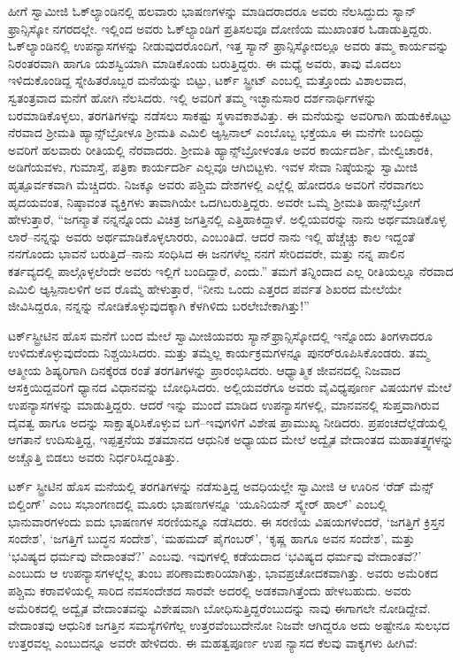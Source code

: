 ಹೀಗೆ ಸ್ವಾಮೀಜಿ ಓಕ್​ಲ್ಯಾಂಡಿನಲ್ಲಿ ಹಲವಾರು ಭಾಷಣಗಳನ್ನು ಮಾಡಿದರಾದರೂ ಅವರು ನೆಲಸಿದ್ದುದು ಸ್ಯಾನ್ ಫ್ರಾನ್ಸಿಸ್ಕೋ ನಗರದಲ್ಲೇ. ಇಲ್ಲಿಂದ ಅವರು ಓಕ್​ಲ್ಯಾಂಡಿಗೆ ಪ್ರತಿಸಲವೂ ದೋಣಿಯ ಮುಖಾಂತರ ಓಡಾಡುತ್ತಿದ್ದರು. ಓಕ್​ಲ್ಯಾಂಡಿನಲ್ಲಿ ಉಪನ್ಯಾಸಗಳನ್ನು ನೀಡುವುದರೊಂದಿಗೆ, ಇತ್ತ ಸ್ಯಾನ್ ಫ್ರಾನ್ಸಿಸ್ಕೋದಲ್ಲೂ ಅವರು ತಮ್ಮ ಕಾರ್ಯವನ್ನು ನಿರಂತರವಾಗಿ ಹಾಗೂ ಯಶಸ್ವಿಯಾಗಿ ಮಾಡಿಕೊಂಡು ಬರುತ್ತಿದ್ದರು. ಈ ಮಧ್ಯೆ ಅವರು, ತಾವು ಮೊದಲು ಇಳಿದುಕೊಂಡಿದ್ದ ಸ್ನೇಹಿತರೊಬ್ಬರ ಮನೆಯನ್ನು ಬಿಟ್ಟು, ಟರ್ಕ್ ಸ್ಟ್ರೀಟ್ ಎಂಬಲ್ಲಿ ಮತ್ತೊಂದು ವಿಶಾಲವಾದ, ಸ್ವತಂತ್ರವಾದ ಮನೆಗೆ ಹೋಗಿ ನೆಲಸಿದರು. ಇಲ್ಲಿ ಅವರಿಗೆ ತಮ್ಮ ಇಚ್ಛಾನುಸಾರ ದರ್ಶನಾರ್ಥಿಗಳನ್ನು ಬರಮಾಡಿಕೊಳ್ಳಲು, ತರಗತಿಗಳನ್ನು ನಡೆಸಲು ಸಾಕಷ್ಟು ಸ್ಥಳಾವಕಾಶವಿತ್ತು. ಈ ಮನೆಯನ್ನು ಅವರಿಗಾಗಿ ಹುಡುಕಿಕೊಟ್ಟು ನೆರವಾದ ಶ್ರೀಮತಿ ಹ್ಯಾನ್ಸ್​ಬ್ರೋಳೂ ಶ್ರೀಮತಿ ಎಮಿಲಿ ಆ್ಯಸ್ಪಿನಾಲ್ ಎಂಬೊಬ್ಬ ಭಕ್ತೆಯೂ ಈ ಮನೆಗೇ ಬಂದಿದ್ದು ಅವರಿಗೆ ಹಲವಾರು ರೀತಿಯಲ್ಲಿ ನೆರವಾದರು. ಶ್ರೀಮತಿ ಹ್ಯಾನ್ಸ್​ಬ್ರೋಳಂತೂ ಅವರ ಕಾರ್ಯದರ್ಶಿ, ಮೇಲ್ವಿಚಾರಕಿ, ಅಡಿಗೆಯವಳು, ಗುಮಾಸ್ತೆ, ಪತ್ರಿಕಾ ಕಾರ್ಯದರ್ಶಿ ಎಲ್ಲವೂ ಆಗಿಬಿಟ್ಟಳು. ಇವಳ ಸೇವಾ ನಿಷ್ಠೆಯನ್ನು ಸ್ವಾಮೀಜಿ ಹೃತ್ಪೂರ್ವಕವಾಗಿ ಮೆಚ್ಚಿದರು. ನಿಜಕ್ಕೂ ಅವರು ಪಶ್ಚಿಮ ದೇಶಗಳಲ್ಲಿ ಎಲ್ಲೆಲ್ಲಿ ಹೋದರೂ ಅವರಿಗೆ ನೆರವಾಗಲು ಹೃದಯವಂತ, ನಿಷ್ಠಾವಂತ ವ್ಯಕ್ತಿಗಳು ತಾವಾಗಿಯೇ ಒದಗಿಬರುತ್ತಿದ್ದರು. ಅವರೇ ಒಮ್ಮೆ ಶ್ರೀಮತಿ ಹಾನ್ಸ್​ಬ್ರೋಗೆ ಹೇಳುತ್ತಾರೆ, “ಜಗನ್ಮಾತೆ ನನ್ನನ್ನೊಂದು ವಿಚಿತ್ರ ಜಗತ್ತಿನಲ್ಲಿ ಎತ್ತಿಹಾಕಿದ್ದಾಳೆ. ಅಲ್ಲಿಯವರನ್ನು ನಾನು ಅರ್ಥಮಾಡಿಕೊಳ್ಳ ಲಾರೆ–ನನ್ನನ್ನು ಅವರು ಅರ್ಥಮಾಡಿಕೊಳ್ಳಲಾರರು, ಎಂಬಂತಿದೆ. ಆದರೆ ನಾನು ಇಲ್ಲಿ ಹೆಚ್ಚೆಚ್ಚು ಕಾಲ ಇದ್ದಂತೆ ನನಗೊಂದು ಭಾವನೆ ಬರುತ್ತಿದೆ–ನಾನು ಸಂಧಿಸಿದ ಈ ಜನಗಳೆಲ್ಲ ನನಗೆ ಸೇರಿದವರೇ, ಮತ್ತು ನನ್ನ ಪಾಲಿನ ಕರ್ತವ್ಯದಲ್ಲಿ ಪಾಲ್ಗೊಳ್ಳಲೆಂದೇ ಅವರು ಇಲ್ಲಿಗೆ ಬಂದಿದ್ದಾರೆ, ಎಂದು.” ತಮಗೆ ತನ್ನಿಂದಾದ ಎಲ್ಲ ರೀತಿಯಲ್ಲೂ ನೆರವಾದ ಎಮಿಲಿ ಆ್ಯಸ್ಪಿನಾಲಳಿಗೆ ಅವ ರೊಮ್ಮೆ ಹೇಳುತ್ತಾರೆ, “ನೀನು ಒಂದು ಎತ್ತರದ ಪರ್ವತ ಶಿಖರದ ಮೇಲೆಯೇ ಜೀವಿಸಿದ್ದರೂ, ನನ್ನನ್ನು ನೋಡಿಕೊಳ್ಳುವುದಕ್ಕಾಗಿ ಕೆಳಗಿಳಿದು ಬರಲೇಬೇಕಾಗಿತ್ತು!”

ಟರ್ಕ್​ಸ್ಟ್ರೀಟಿನ ಹೊಸ ಮನೆಗೆ ಬಂದ ಮೇಲೆ ಸ್ವಾಮೀಜಿಯವರು ಸ್ಯಾನ್​ಫ್ರಾನ್ಸಿಸ್ಕೋದಲ್ಲಿ ಇನ್ನೊಂದು ತಿಂಗಳಾದರೂ ಉಳಿದುಕೊಳ್ಳುವುದೆಂದು ನಿಶ್ಚಯಿಸಿದರು. ಮತ್ತು ತಮ್ಮೆಲ್ಲ ಕಾರ್ಯಕ್ರಮಗಳನ್ನೂ ಪುನರ್​ರೂಪಿಸಿಕೊಂಡರು. ತಮ್ಮ ಆತ್ಮೀಯ ಶಿಷ್ಯರಿಗಾಗಿ ದಿನಕ್ಕೆರಡ ರಂತೆ ತರಗತಿಗಳನ್ನು ಪ್ರಾರಂಭಿಸಿದರು. ಆಧ್ಯಾತ್ಮಿಕ ಜೀವನದಲ್ಲಿ ನಿಜವಾದ ಆಸಕ್ತಿಯಿದ್ದವರಿಗೆ ಧ್ಯಾನದ ವಿಧಾನವನ್ನು ಬೋಧಿಸಿದರು. ಅಲ್ಲಿಯವರೆಗೂ ಅವರು ವೈವಿಧ್ಯಪೂರ್ಣ ವಿಷಯಗಳ ಮೇಲೆ ಉಪನ್ಯಾಸಗಳನ್ನು ಮಾಡುತ್ತಿದ್ದರು. ಆದರೆ ಇನ್ನು ಮುಂದೆ ಮಾಡಿದ ಉಪನ್ಯಾಸಗಳಲ್ಲಿ, ಮಾನವನಲ್ಲಿ ಸುಪ್ತವಾಗಿರುವ ದೈವತ್ವ ಹಾಗೂ ಅದನ್ನು ಸಾಕ್ಷಾತ್ಕರಿಸಿಕೊಳ್ಳುವ ಬಗೆ–ಇವುಗಳಿಗೆ ವಿಶೇಷ ಪ್ರಾಮುಖ್ಯ ನೀಡಿದರು. ಪ್ರಪಂಚದೆಲ್ಲೆಡೆಯಲ್ಲಿ ಆಗತಾನೆ ಉದಿಸುತ್ತಿದ್ದ, ಇಪ್ಪತ್ತನೆಯ ಶತಮಾನದ ಆಧುನಿಕ ಅಧ್ಯಾಯದ ಮೇಲೆ ಅದ್ವೈತ ವೇದಾಂತದ ಮಹಾತತ್ತ್ವಗಳನ್ನು ಅಚ್ಚೊತ್ತಿ ಬಿಡಲು ಅವರು ನಿರ್ಧರಿಸಿದ್ದಂತಿತ್ತು.

ಟರ್ಕ್ ಸ್ಟ್ರೀಟಿನ ಹೊಸ ಮನೆಯಲ್ಲಿ ತರಗತಿಗಳನ್ನು ನಡೆಸುತ್ತಿದ್ದ ಅವಧಿಯಲ್ಲೇ ಸ್ವಾಮೀಜಿ ಆ ಊರಿನ ‘ರೆಡ್ ಮೆನ್ಸ್ ಬಿಲ್ಡಿಂಗ್​’ ಎಂಬ ಸಭಾಂಗಣದಲ್ಲಿ ಮೂರು ಭಾಷಣಗಳನ್ನೂ ‘ಯೂನಿಯನ್ ಸ್ಕ್ವೇರ್ ಹಾಲ್​’ ಎಂಬಲ್ಲಿ ಭಾನುವಾರಗಳಂದು ಐದು ಭಾಷಣಗಳ ಸರಣಿಯನ್ನೂ ನಡೆಸಿದರು. ಈ ಸರಣಿಯ ವಿಷಯಗಳೆಂದರೆ, ‘ಜಗತ್ತಿಗೆ ಕ್ರಿಸ್ತನ ಸಂದೇಶ’, ‘ಜಗತ್ತಿಗೆ ಬುದ್ಧನ ಸಂದೇಶ’, ‘ಮಹಮದ್ ಪೈಗಂಬರ್​’, ‘ಕೃಷ್ಣ ಹಾಗೂ ಅವನ ಸಂದೇಶ’, ಮತ್ತು ‘ಭವಿಷ್ಯದ ಧರ್ಮವು ವೇದಾಂತವೆ?’ ಎಂಬವು. ಇವುಗಳಲ್ಲಿ ಕಡೆಯದಾದ ‘ಭವಿಷ್ಯದ ಧರ್ಮವು ವೇದಾಂತವೆ?’ ಎಂಬುದು ಆ ಉಪನ್ಯಾಸಗಳಲ್ಲೆಲ್ಲ ತುಂಬ ಪರಿಣಾಮಕಾರಿಯಾಗಿತ್ತು, ಭಾವಪ್ರಚೋದಕವಾಗಿತ್ತು. ಅವರು ಅಮೆರಿಕದ ಪಶ್ಚಿಮ ಕರಾವಳಿಯಲ್ಲಿ ಸಾರಿದ ನವಸಂದೇಶದ ಸಾರವೇ ಅದರಲ್ಲಿ ಅಡಕವಾಗಿತ್ತೆಂದು ಹೇಳಬಹುದು. ಅವರು ಅಮೆರಿಕದಲ್ಲಿ ಅದ್ವೈತ ವೇದಾಂತವನ್ನು ವಿಶೇಷವಾಗಿ ಬೋಧಿಸುತ್ತಿದ್ದರೆಂಬುದನ್ನು ನಾವು ಈಗಾಗಲೇ ನೋಡಿದ್ದೇವೆ. ವೇದಾಂತವು ಆಧುನಿಕ ಜಗತ್ತಿನ ಸಮಸ್ಯೆಗಳಿಗೆಲ್ಲ ಉತ್ತರವೆಂಬುದೇನೋ ನಿಜವೇ ಆಗಿದ್ದರೂ ಅದು ಅಷ್ಟೇನೂ ಸುಲಭದ ಉತ್ತರವಲ್ಲ ಎಂಬುದನ್ನೂ ಅವರೇ ಹೇಳಿದರು. ಈ ಮಹತ್ವಪೂರ್ಣ ಉಪ ನ್ಯಾಸದ ಕೆಲವು ವಾಕ್ಯಗಳು ಹೀಗಿವೆ:

